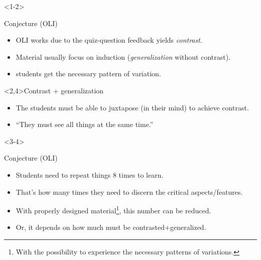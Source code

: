 \begin{frame}
  \begin{onlyenv}<1-2>
    \begin{alertblock}{Conjecture (OLI)}
      \begin{itemize}
        \item OLI works due to the quiz-question feedback yields 
          \emph{contrast}.
        \item Material usually focus on induction (\emph{generalization} 
          without contrast).
        \item \Ie students get the necessary pattern of variation.
      \end{itemize}
    \end{alertblock}
  \end{onlyenv}

  \begin{block}<2,4>{Contrast + generalization}
    \begin{itemize}
      \item The students must be able to juxtapose (in their mind) to achieve 
        contrast.
      \item \enquote{They must see all things at the same time.}
    \end{itemize}
  \end{block}

  \begin{onlyenv}<3-4>
    \begin{alertblock}{Conjecture (OLI)}
      \begin{itemize}
        \item Students need to repeat things 8 times to learn.
        \item That's how many times they need to discern the critical 
          aspects/features.
        \item With properly designed material\footnote{%
            With the possibility to experience the necessary patterns of 
            variations.
          }, this number can be reduced.
        \item Or, it depends on how much must be contrasted+generalized.
      \end{itemize}
    \end{alertblock}
  \end{onlyenv}
\end{frame}

\begin{frame}
\end{frame}

